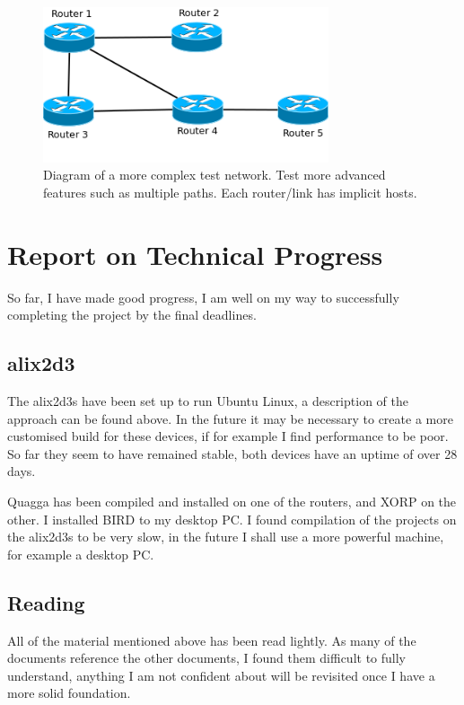 \documentclass[12pt]{report}
\begin{document}
\begin{figure}
\centering
\includegraphics[width=0.75\textwidth]{../Diagrams/Network/ComplexTestNet.png}
\caption{Diagram of a more complex test network. Test more advanced features
such as multiple paths. Each router/link has implicit hosts.}
\label{fig:ComplexTestNet}
\end{figure}

\chapter{Report on Technical Progress}
So far, I have made good progress, I am well on my way to successfully
completing the project by the final deadlines.

\section{alix2d3}
The alix2d3s have been set up to run Ubuntu Linux, a description of the
approach can be found above. In the future it may be necessary to create a more
customised build for these devices, if for example I find performance to be
poor. So far they seem to have remained stable, both devices have an uptime of
over 28 days.

Quagga has been compiled and installed on one of the routers, and XORP on the
other. I installed BIRD to my desktop PC. I found compilation of the projects on
the alix2d3s to be very slow, in the future I shall use a more powerful
machine, for example a desktop PC.

\section{Reading}
All of the material mentioned above has been read lightly. As many of the
documents reference the other documents, I found them difficult to fully
understand, anything I am not confident about will be revisited once I have
a more solid foundation.
\end{document}
